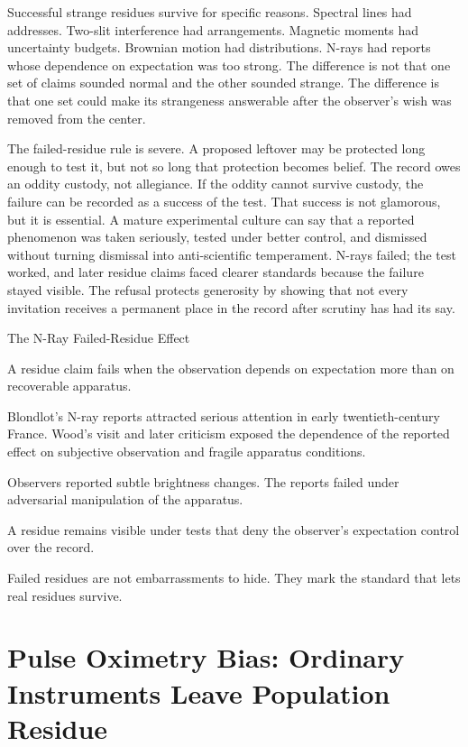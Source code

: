 Successful strange residues survive for specific reasons. Spectral lines had
addresses. Two-slit interference had arrangements. Magnetic moments had
uncertainty budgets. Brownian motion had distributions. N-rays had reports
whose dependence on expectation was too strong. The difference is not that
one set of claims sounded normal and the other sounded strange. The
difference is that one set could make its strangeness answerable after the
observer's wish was removed from the center.

The failed-residue rule is severe. A proposed leftover may be protected long
enough to test it, but not so long that protection becomes belief. The
record owes an oddity custody, not allegiance. If the oddity cannot survive
custody, the failure can be recorded as a success of the test.
That success is not glamorous, but it is essential. A mature experimental
culture can say that a reported phenomenon was taken seriously, tested under
better control, and dismissed without turning dismissal into anti-scientific
temperament. N-rays failed; the test worked, and later residue claims faced clearer
standards because the failure stayed visible.
The refusal protects generosity by showing that not every invitation
receives a permanent place in the record after scrutiny has had its say.

\begin{phenom}{The N-Ray Failed-Residue Effect~\cite{blondlot1904,wood1904}}
\label{ph:nray-failed-residue}

\PhStatement
A residue claim fails when the observation depends on expectation more than on
recoverable apparatus.

\PhOrigin
Blondlot's N-ray reports attracted serious attention in early twentieth-century
France. Wood's visit and later criticism exposed the dependence of the reported
effect on subjective observation and fragile apparatus conditions.

\PhObservation
Observers reported subtle brightness changes. The reports failed under
adversarial manipulation of the apparatus.

\PhConstraint
A residue remains visible under tests that deny the observer's expectation
control over the record.

\PhConsequence
Failed residues are not embarrassments to hide. They mark the standard that
lets real residues survive.
\end{phenom}

\section{Pulse Oximetry Bias: Ordinary Instruments Leave Population Residue}

